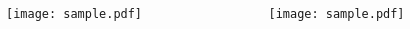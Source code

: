 \begin{frame}
  \begin{columns}
    \begin{column}{5.5cm}
      \begin{block}{}
      \texttt{[image: sample.pdf]}
      \end{block}
    \end{column}
    \begin{column}{5.5cm}
      \begin{block}{}
      \texttt{[image: sample.pdf]}
      \end{block}
    \end{column}
  \end{columns}
\end{frame}


